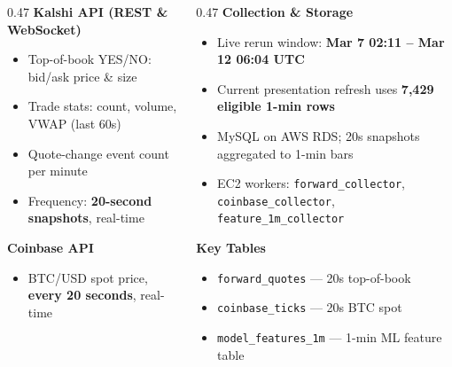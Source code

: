 \documentclass[english, xcolor=dvipsnames, aspectratio=169]{beamer}
\newcommand{\sectiontitle}{}
\begin{document}
\begin{frame}{\sectiontitle}
\scriptsize
\begin{columns}[T]
    \begin{column}{0.47\textwidth}
        \textbf{Kalshi API (REST \& WebSocket)}
        \begin{itemize}
            \item Top-of-book YES/NO: bid/ask price \& size
            \item Trade stats: count, volume, VWAP (last 60s)
            \item Quote-change event count per minute
            \item Frequency: \textbf{20-second snapshots}, real-time
        \end{itemize}
        \vspace{0.1cm}
        \textbf{Coinbase API}
        \begin{itemize}
            \item BTC/USD spot price, \textbf{every 20 seconds}, real-time
        \end{itemize}
    \end{column}
    \begin{column}{0.47\textwidth}
        \textbf{Collection \& Storage}
        \begin{itemize}
            \item Live rerun window: \textbf{Mar 7 02:11 -- Mar 12 06:04 UTC}
            \item Current presentation refresh uses \textbf{7,429 eligible 1-min rows}
            \item MySQL on AWS RDS; 20s snapshots aggregated to 1-min bars
            \item EC2 workers: \texttt{forward\_collector}, \texttt{coinbase\_collector}, \texttt{feature\_1m\_collector}
        \end{itemize}
        \vspace{0.1cm}
        \textbf{Key Tables}
        \begin{itemize}
            \item \texttt{forward\_quotes} --- 20s top-of-book
            \item \texttt{coinbase\_ticks} --- 20s BTC spot
            \item \texttt{model\_features\_1m} --- 1-min ML feature table
        \end{itemize}
    \end{column}
\end{columns}
\end{frame}
\end{document}
